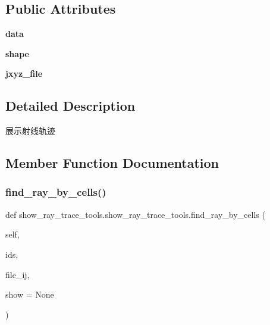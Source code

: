 \subsection*{Public Attributes}
\begin{DoxyCompactItemize}
\item 
\mbox{\label{classshow__ray__trace__tools_1_1show__ray__trace__tools_aa7201c978803417a4a9a8c5b3f9f605d}} 
{\bfseries data}
\item 
\mbox{\label{classshow__ray__trace__tools_1_1show__ray__trace__tools_a1a379e58248918e924911cbaaeb232f0}} 
{\bfseries shape}
\item 
\mbox{\label{classshow__ray__trace__tools_1_1show__ray__trace__tools_a51c1f6dd8c5aedd5e1a72c86f1d32f4a}} 
{\bfseries jxyz\+\_\+file}
\end{DoxyCompactItemize}


\subsection{Detailed Description}
\begin{DoxyVerb}展示射线轨迹\end{DoxyVerb}
 

\subsection{Member Function Documentation}
\mbox{\label{classshow__ray__trace__tools_1_1show__ray__trace__tools_a4ad007119a9d2eb6d061ce6f776da3ee}} 
\subsubsection{\texorpdfstring{find\+\_\+ray\+\_\+by\+\_\+cells()}{find\_ray\_by\_cells()}}
{\footnotesize\ttfamily def show\+\_\+ray\+\_\+trace\+\_\+tools.\+show\+\_\+ray\+\_\+trace\+\_\+tools.\+find\+\_\+ray\+\_\+by\+\_\+cells (\begin{DoxyParamCaption}\item[{}]{self,  }\item[{}]{ids,  }\item[{}]{file\+\_\+ij,  }\item[{}]{show = {\ttfamily None} }\end{DoxyParamCaption})}

